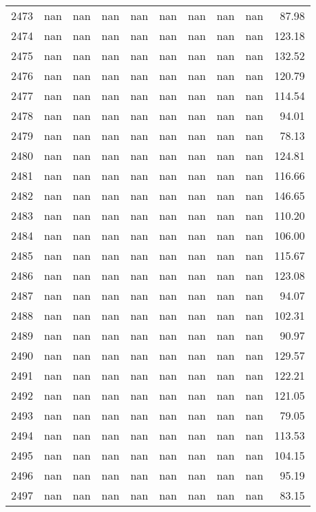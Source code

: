 \begin{tabular}{lrrrrrrrrr}
2473 & nan & nan & nan & nan & nan & nan & nan & nan & 87.98 \\
2474 & nan & nan & nan & nan & nan & nan & nan & nan & 123.18 \\
2475 & nan & nan & nan & nan & nan & nan & nan & nan & 132.52 \\
2476 & nan & nan & nan & nan & nan & nan & nan & nan & 120.79 \\
2477 & nan & nan & nan & nan & nan & nan & nan & nan & 114.54 \\
2478 & nan & nan & nan & nan & nan & nan & nan & nan & 94.01 \\
2479 & nan & nan & nan & nan & nan & nan & nan & nan & 78.13 \\
2480 & nan & nan & nan & nan & nan & nan & nan & nan & 124.81 \\
2481 & nan & nan & nan & nan & nan & nan & nan & nan & 116.66 \\
2482 & nan & nan & nan & nan & nan & nan & nan & nan & 146.65 \\
2483 & nan & nan & nan & nan & nan & nan & nan & nan & 110.20 \\
2484 & nan & nan & nan & nan & nan & nan & nan & nan & 106.00 \\
2485 & nan & nan & nan & nan & nan & nan & nan & nan & 115.67 \\
2486 & nan & nan & nan & nan & nan & nan & nan & nan & 123.08 \\
2487 & nan & nan & nan & nan & nan & nan & nan & nan & 94.07 \\
2488 & nan & nan & nan & nan & nan & nan & nan & nan & 102.31 \\
2489 & nan & nan & nan & nan & nan & nan & nan & nan & 90.97 \\
2490 & nan & nan & nan & nan & nan & nan & nan & nan & 129.57 \\
2491 & nan & nan & nan & nan & nan & nan & nan & nan & 122.21 \\
2492 & nan & nan & nan & nan & nan & nan & nan & nan & 121.05 \\
2493 & nan & nan & nan & nan & nan & nan & nan & nan & 79.05 \\
2494 & nan & nan & nan & nan & nan & nan & nan & nan & 113.53 \\
2495 & nan & nan & nan & nan & nan & nan & nan & nan & 104.15 \\
2496 & nan & nan & nan & nan & nan & nan & nan & nan & 95.19 \\
2497 & nan & nan & nan & nan & nan & nan & nan & nan & 83.15 \\

\end{tabular}
